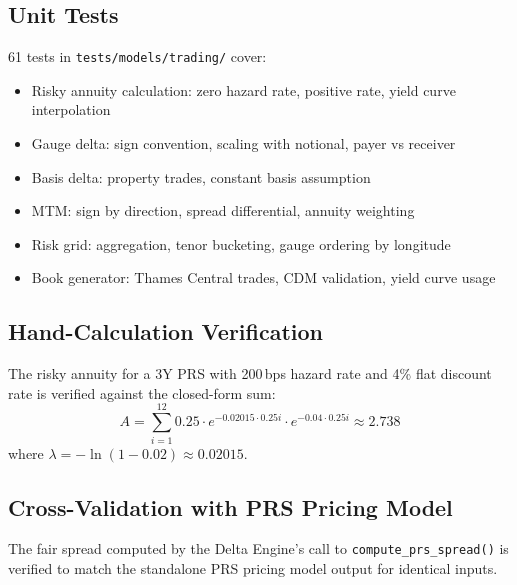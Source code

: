 \documentclass[11pt,a4paper]{article}
\begin{document}
\clearpage

\mkmvalidation

\subsection{Unit Tests}

61 tests in \texttt{tests/models/trading/} cover:
\begin{itemize}
    \item Risky annuity calculation: zero hazard rate, positive rate, yield curve interpolation
    \item Gauge delta: sign convention, scaling with notional, payer vs receiver
    \item Basis delta: property trades, constant basis assumption
    \item MTM: sign by direction, spread differential, annuity weighting
    \item Risk grid: aggregation, tenor bucketing, gauge ordering by longitude
    \item Book generator: Thames Central trades, CDM validation, yield curve usage
\end{itemize}

\subsection{Hand-Calculation Verification}

The risky annuity for a 3Y PRS with 200\,bps hazard rate and 4\% flat discount rate is verified against the closed-form sum:
\begin{equation}
    A = \sum_{i=1}^{12} 0.25 \cdot e^{-0.02015 \cdot 0.25i} \cdot e^{-0.04 \cdot 0.25i} \approx 2.738
\end{equation}
where $\lambda = -\ln(1 - 0.02) \approx 0.02015$.

\subsection{Cross-Validation with PRS Pricing Model}

The fair spread computed by the Delta Engine's call to \texttt{compute\_prs\_spread()} is verified to match the standalone PRS pricing model output for identical inputs.

\clearpage
\end{document}

